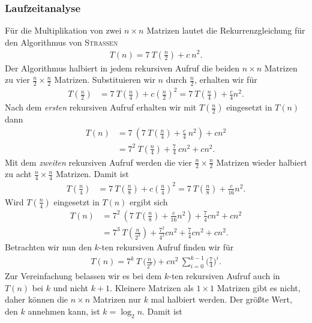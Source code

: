 \documentclass[oneside]{scrbook}
\numberwithin{equation}{section}
\begin{document}
\subsubsection{Laufzeitanalyse}
Für die Multiplikation von zwei $n \times n$ Matrizen lautet die Rekurrenzgleichung für den Algorithmus von \textsc{Strassen}
\begin{align*}
	T(n) = 7 \: T(\tfrac{n}{2}) + c\: n^2.
\end{align*}
Der Algorithmus halbiert in jedem rekursiven Aufruf die beiden $n \times n$ Matrizen zu vier $\tfrac{n}{2} \times \tfrac{n}{2}$ Matrizen. Substituieren wir $n$ durch $\tfrac{n}{2}$, erhalten wir für
\begin{align*}
	T(\tfrac{n}{2}) &= 7 \: T(\tfrac{n}{4}) + c(\tfrac{n}{2})^2 = 7 \: T(\tfrac{n}{4}) + \tfrac{c}{4}n^2.
\end{align*}
Nach dem \textit{ersten} rekursiven Aufruf erhalten wir mit $T(\frac{n}{2})$ eingesetzt in $T(n)$ dann
\begin{align*}
	T(n) &= 7 \: (7 \: T(\tfrac{n}{4}) + \tfrac{c}{4} \: n^2) + c n^2 \\
	&= 7^2\: T(\tfrac{n}{4}) + \tfrac{7}{4} \: cn^2 + c n^2.
\end{align*}
Mit dem \textit{zweiten} rekursiven Aufruf werden die vier $\tfrac{n}{2} \times \tfrac{n}{2}$ Matrizen wieder halbiert zu acht $\tfrac{n}{4} \times \tfrac{n}{4}$ Matrizen. Damit ist
\begin{align*}
	T(\tfrac{n}{4}) &= 7 \: T(\tfrac{n}{8}) + c(\tfrac{n}{4})^2 = 7 \: T(\tfrac{n}{8}) + \tfrac{c}{16}n^2.
\end{align*}
Wird $T(\tfrac{n}{4})$ eingesetzt in $T(n)$ ergibt sich
\begin{align*}
	T(n) &= 7^2\: (7 \: T(\tfrac{n}{8}) + \tfrac{c}{16}n^2) + \tfrac{7}{4}cn^2 + c n^2 \\
	&= 7^3\: T(\tfrac{n}{2^3}) + \tfrac{7^2}{4^2}cn^2 + \tfrac{7}{4}cn^2 + c n^2.
\end{align*}
Betrachten wir nun den $k$-ten rekursiven Aufruf finden wir für 
\begin{align*}
	T(n) = 7^k \: T \: \big(\tfrac{n}{2^k}\big) + cn^2 \: \sum_{i = 0}^{k-1} \bigg(\frac{7}{4}\bigg)^i.
\end{align*}
Zur Vereinfachung belassen wir es bei dem $k$-ten rekursiven Aufruf auch in $T(n)$ bei $k$ und nicht $k + 1$. Kleinere Matrizen als $1 \times 1$ Matrizen gibt es nicht, daher können die $n \times n$ Matrizen nur $k$ mal halbiert werden. Der größte Wert, den $k$ annehmen kann, ist $k = \log_{2}n$. Damit ist
\end{document}
